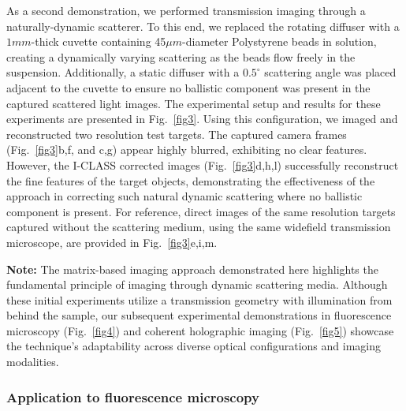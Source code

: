 \documentclass[pdflatex,sn-mathphys-num]{sn-jnl}%
\theoremstyle{thmstyleone}%
\theoremstyle{thmstyletwo}%
\theoremstyle{thmstylethree}%
\begin{document}
As a second demonstration, we performed transmission imaging through a naturally-dynamic scatterer. To this end, we replaced the rotating diffuser with a $1mm$-thick cuvette containing 45$\mu m$-diameter Polystyrene beads in solution, creating a dynamically varying scattering as the beads flow freely in the suspension. Additionally, a static diffuser with a $0.5 ^\circ$ scattering angle was placed adjacent to the cuvette to ensure no ballistic component was present in the captured scattered light images. The experimental setup and results for these experiments are presented in Fig.~\ref{fig3}. 
Using this configuration, we imaged and reconstructed two resolution test targets. The captured camera frames (Fig.~\ref{fig3}b,f, and c,g) appear highly blurred, exhibiting no clear features. However, the I-CLASS corrected images (Fig.~\ref{fig3}d,h,l) successfully reconstruct the fine features of the target objects, demonstrating the effectiveness of the approach in correcting such natural dynamic scattering where no ballistic component is present. For reference, direct images of the same resolution targets captured without the scattering medium, using the same widefield transmission microscope, are provided in Fig.~\ref{fig3}e,i,m.

\textbf{Note:} The matrix-based imaging approach demonstrated here highlights the fundamental principle of imaging through dynamic scattering media. Although these initial experiments utilize a transmission geometry with illumination from behind the sample, our subsequent experimental demonstrations in fluorescence microscopy (Fig.~\ref{fig4}) and coherent holographic imaging (Fig.~\ref{fig5}) showcase the technique's adaptability across diverse optical configurations and imaging modalities.








\subsubsection*{Application to fluorescence microscopy}
\end{document}

